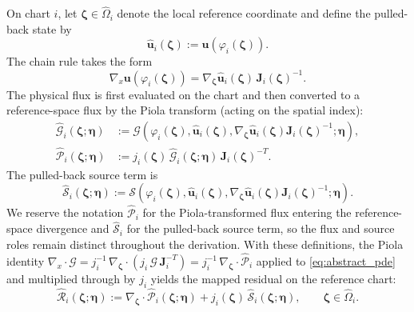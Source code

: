 \documentclass[sort&compress]{svjour3} %
\newcommand{\tensor}[1]{\ensuremath{\boldsymbol{#1}}}
\begin{document}
On chart $i$, let $\boldsymbol{\zeta}\in\widehat{\Omega}_i$ denote the local reference coordinate and define the pulled-back state by
\begin{equation}
\widehat{\tensor u}_i(\boldsymbol{\zeta}):=\tensor u(\varphi_i(\boldsymbol{\zeta})).
\label{eq:pullback_state}
\end{equation}
The chain rule takes the form
\begin{equation}
\nabla_x \tensor u(\varphi_i(\boldsymbol{\zeta}))
=
\nabla_{\boldsymbol{\zeta}} \widehat{\tensor u}_i(\boldsymbol{\zeta})\,\mathbf{J}_i(\boldsymbol{\zeta})^{-1}.
\label{eq:grad_pullback}
\end{equation}
The physical flux is first evaluated on the chart and then converted to a reference-space flux by the Piola transform (acting on the spatial index):
\begin{align}
\widehat{\mathcal{G}}_i(\boldsymbol{\zeta};\tensor\eta)
&:=
\mathcal{G}\!\left(\varphi_i(\boldsymbol{\zeta}),\widehat{\tensor u}_i(\boldsymbol{\zeta}),\nabla_{\boldsymbol{\zeta}} \widehat{\tensor u}_i(\boldsymbol{\zeta})\mathbf{J}_i(\boldsymbol{\zeta})^{-1};\tensor\eta\right),
\label{eq:pullback_flux}\\
\widehat{\mathcal{P}}_i(\boldsymbol{\zeta};\tensor\eta)
&:=
j_i(\boldsymbol{\zeta})\,\widehat{\mathcal{G}}_i(\boldsymbol{\zeta};\tensor\eta)\,\mathbf{J}_i(\boldsymbol{\zeta})^{-T}.
\label{eq:piola_flux}
\end{align}
The pulled-back source term is
\begin{equation}
\widehat{\mathcal{S}}_i(\boldsymbol{\zeta};\tensor\eta)
:=
\mathcal{S}\!\left(\varphi_i(\boldsymbol{\zeta}),\widehat{\tensor u}_i(\boldsymbol{\zeta}),\nabla_{\boldsymbol{\zeta}} \widehat{\tensor u}_i(\boldsymbol{\zeta})\mathbf{J}_i(\boldsymbol{\zeta})^{-1};\tensor\eta\right).
\label{eq:pullback_source}
\end{equation}
We reserve the notation $\widehat{\mathcal{P}}_i$ for the Piola-transformed flux entering the reference-space divergence and $\widehat{\mathcal{S}}_i$ for the pulled-back source term, so the flux and source roles remain distinct throughout the derivation.
With these definitions, the Piola identity $\nabla_x\cdot\mathcal{G} = j_i^{-1}\,\nabla_{\boldsymbol{\zeta}}\cdot(j_i\,\mathcal{G}\,\mathbf{J}_i^{-T}) = j_i^{-1}\,\nabla_{\boldsymbol{\zeta}}\cdot\widehat{\mathcal{P}}_i$ applied to \eqref{eq:abstract_pde} and multiplied through by $j_i$ yields the mapped residual on the reference chart:
\begin{equation}
\widehat{\mathcal{R}}_i(\boldsymbol{\zeta};\tensor\eta)
:=
\nabla_{\boldsymbol{\zeta}}\cdot \widehat{\mathcal{P}}_i(\boldsymbol{\zeta};\tensor\eta)
+
j_i(\boldsymbol{\zeta})\,\widehat{\mathcal{S}}_i(\boldsymbol{\zeta};\tensor\eta),
\qquad \boldsymbol{\zeta}\in \widehat{\Omega}_i.
\label{eq:mapped_residual}
\end{equation}
\end{document}

